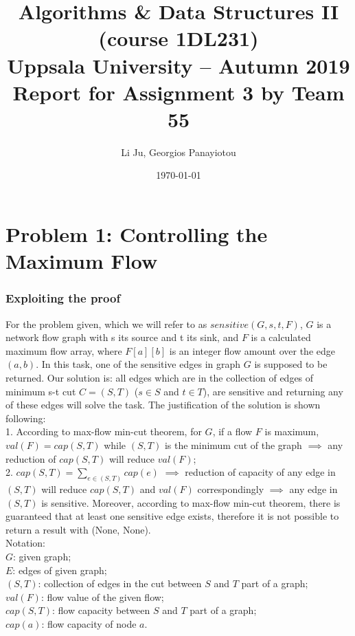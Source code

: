 \documentclass[a4paper,11pt]{article}
\title{\textbf{Algorithms \& Data Structures II (course 1DL231) \\
    Uppsala University -- Autumn 2019 \\
    Report for Assignment 3
    by Team 55}}
\author{Li Ju, Georgios Panayiotou}
\date{\today}
\begin{document}
\maketitle

\part{Problem 1: Controlling the Maximum Flow}
\section{Exploiting the proof}

For the problem given, which we will refer to as $sensitive(G,s,t,F)$, $G$ is a network flow graph with s its source and t its sink, and $F$ is a calculated maximum flow array, where $F[a][b]$ is an integer flow amount over the edge $(a,b)$. In this task, one of the sensitive edges in graph $G$ is supposed to be returned. Our solution is: all edges which are in the collection of edges of minimum s-t cut $C=(S, T)$ ($s\in S$ and $t \in T$), are sensitive and returning any of these edges will solve the task. The justification of the solution is shown following: \\

1. According to max-flow min-cut theorem, for $G$, if a flow $F$ is maximum, $val(F)=cap(S,T)$ while $(S, T)$ is the minimum cut of the graph $\implies$ any reduction of $cap(S, T)$ will reduce $val(F)$; \\
2. $cap(S, T) = \sum\nolimits_{e \in (S, T)} cap(e)$ $\implies$ reduction of capacity of any edge in $(S, T)$ will reduce $cap(S, T)$ and $val(F)$ correspondingly $\implies$ any edge in $(S, T)$ is sensitive. Moreover, according to max-flow min-cut theorem, there is guaranteed that at least one sensitive edge exists, therefore it is not possible to return a result with (None, None).\\

Notation: \\$G$: given graph; \\$E$: edges of given graph; \\$(S, T)$: collection of edges in the cut between $S$ and $T$ part of a graph;\\
$val(F)$: flow value of the given flow; \\$cap(S, T)$: flow capacity between $S$ and $T$ part of a graph; \\
$cap(a)$: flow capacity of node $a$. \\
\end{document}
